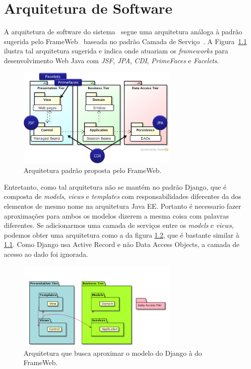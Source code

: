 
\chapter{Arquitetura de Software}
\label{sec-arquitetura}

A arquitetura de software do sistema~\imprimirtitulo{} segue uma arquitetura análoga à padrão sugerida pelo FrameWeb~\cite{souza:masterthesis07,souza-et-al:iism09} baseada no padrão Camada de Serviço~\cite{fowler:book02}. A Figura~\ref{figura-arquitetura-padrao} ilustra tal arquitetura sugerida e indica onde atuariam os \textit{frameworks} para desenvolvimento Web Java com \textit{JSF}, \textit{JPA}, \textit{CDI}, \textit{PrimeFaces} e \textit{Facelets}.

\begin{figure}[h]
	\centering
	\includegraphics[width=0.7\textwidth]{figuras/figura-arquitetura-padrao.png}
	\caption{Arquitetura padrão proposta pelo FrameWeb.}
	\label{figura-arquitetura-padrao}
\end{figure}

Entretanto, como tal arquitetura não se mantém no padrão Django, que é composta de \textit{models}, \textit{views} e \textit{templates} com responsabilidades diferentes da dos elementos de mesmo nome na arquitetura Java EE. Portanto é necessario fazer aproximações para ambos os modelos dizerem a mesma coisa com palavras diferentes. Se adicionarmos uma camada de serviços entre os \textit{models} e \textit{views}, podemos obter uma arquitetura como a da figura \ref{figura-arquitetura-adaptada}, que é bastante similar à \ref{figura-arquitetura-padrao}. Como Django usa Active Record e não Data Access Objects, a camada de acesso ao dado foi ignorada.

\begin{figure}[h]
	\centering
	\includegraphics[width=0.7\textwidth]{figuras/arquitetura.png}
	\caption{Arquitetura que busca aproximar o modelo do Django à do FrameWeb.}
	\label{figura-arquitetura-adaptada}
\end{figure}

